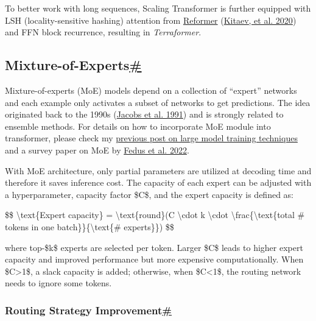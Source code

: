 To better work with long sequences, Scaling Transformer is further equipped with LSH (locality-sensitive hashing) attention from \href{https://lilianweng.github.io/posts/2023-01-27-the-transformer-family-v2/\#locality-sensitive-hashing-reformer}{Reformer} (\href{https://arxiv.org/abs/2001.04451}{Kitaev, et al. 2020}) and FFN block recurrence, resulting in \emph{Terraformer}.

\subsection{\texorpdfstring{Mixture-of-Experts\hyperref[mixture-of-experts]{\#}}{Mixture-of-Experts\#}}\label{mixture-of-experts}

Mixture-of-experts (MoE) models depend on a collection of ``expert'' networks and each example only activates a subset of networks to get predictions. The idea originated back to the 1990s (\href{https://www.cs.toronto.edu/~hinton/absps/jjnh91.pdf}{Jacobs et al. 1991}) and is strongly related to ensemble methods. For details on how to incorporate MoE module into transformer, please check my \href{https://lilianweng.github.io/posts/2021-09-25-train-large/}{previous post on large model training techniques} and a survey paper on MoE by \href{https://arxiv.org/abs/2209.01667}{Fedus et al. 2022}.

With MoE architecture, only partial parameters are utilized at decoding time and therefore it saves inference cost. The capacity of each expert can be adjusted with a hyperparameter, capacity factor \$C\$, and the expert capacity is defined as:

\$\$ \textbackslash text\{Expert capacity\} = \textbackslash text\{round\}(C \textbackslash cdot k \textbackslash cdot \textbackslash frac\{\textbackslash text\{total \# tokens in one batch\}\}\{\textbackslash text\{\# experts\}\}) \$\$

where top-\$k\$ experts are selected per token. Larger \$C\$ leads to higher expert capacity and improved performance but more expensive computationally. When \$C\textgreater1\$, a slack capacity is added; otherwise, when \$C\textless1\$, the routing network needs to ignore some tokens.

\subsubsection{\texorpdfstring{Routing Strategy Improvement\hyperref[routing-strategy-improvement]{\#}}{Routing Strategy Improvement\#}}\label{routing-strategy-improvement}

